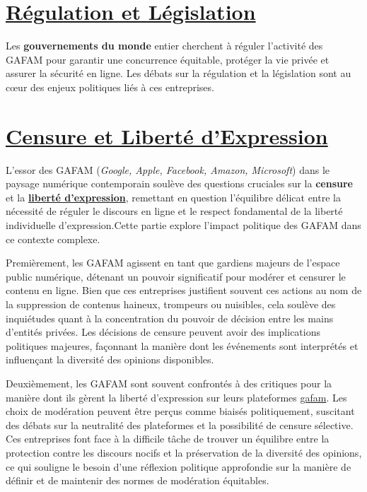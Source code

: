 \documentclass[12pt,a4paper]{article} %
\begin{document}
	\section{\underline{Régulation et Législation} }
	
	Les \textbf{gouvernements du monde} entier cherchent à réguler l'activité des GAFAM pour garantir une concurrence équitable, protéger la vie privée et assurer la sécurité en ligne. Les débats sur la régulation et la législation sont au cœur des enjeux politiques liés à ces entreprises.
	
	\section{\underline{Censure et Liberté d'Expression}}
	
	L'essor des GAFAM (\textit{Google, Apple, Facebook, Amazon, Microsoft}) dans le paysage numérique contemporain soulève des questions cruciales sur la \textbf{censure} et la \textbf{\underline{liberté d'expression}}, remettant en question l'équilibre délicat entre la nécessité de réguler le discours en ligne et le respect fondamental de la liberté individuelle d'expression.Cette partie explore l'impact politique des GAFAM dans ce contexte complexe.
	
	Premièrement, les GAFAM agissent en tant que gardiens majeurs de l'espace public numérique, détenant un pouvoir significatif pour modérer et censurer le contenu en ligne. Bien que ces entreprises justifient souvent ces actions au nom de la suppression de contenus haineux, trompeurs ou nuisibles, cela soulève des inquiétudes quant à la concentration du pouvoir de décision entre les mains d'entités privées. Les décisions de censure peuvent avoir des implications politiques majeures, façonnant la manière dont les événements sont interprétés et influençant la diversité des opinions disponibles.
	
	Deuxièmement, les GAFAM sont souvent confrontés à des critiques pour la manière dont ils gèrent la liberté d'expression sur leurs plateformes \href{https://fr.search.yahoo.com/search?fr=mcafee&type=E211FR1140G0&p=gafam}{gafam}. Les choix de modération peuvent être perçus comme biaisés politiquement, suscitant des débats sur la neutralité des plateformes et la possibilité de censure sélective. Ces entreprises font face à la difficile tâche de trouver un équilibre entre la protection contre les discours nocifs et la préservation de la diversité des opinions, ce qui souligne le besoin d'une réflexion politique approfondie sur la manière de définir et de maintenir des normes de modération équitables. 
	
\end{document}
